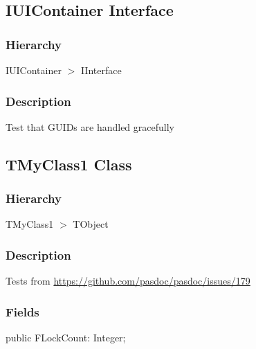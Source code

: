 \documentclass{report}
\newif\ifpdf
\begin{document}
\subsection*{IUIContainer Interface}
\fi
\label{ok_attributes.IUIContainer}
\subsubsection*{\large{\textbf{Hierarchy}}\normalsize\hspace{1ex}\hfill}
IUIContainer {$>$} IInterface
\subsubsection*{\large{\textbf{Description}}\normalsize\hspace{1ex}\hfill}
Test that GUIDs are handled gracefully\ifpdf
\subsection*{\large{\textbf{TMyClass1 Class}}\normalsize\hspace{1ex}\hrulefill}
\else
\subsection*{TMyClass1 Class}
\fi
\label{ok_attributes.TMyClass1}
\subsubsection*{\large{\textbf{Hierarchy}}\normalsize\hspace{1ex}\hfill}
TMyClass1 {$>$} TObject
\subsubsection*{\large{\textbf{Description}}\normalsize\hspace{1ex}\hfill}
Tests from \href{https://github.com/pasdoc/pasdoc/issues/179}{https://github.com/pasdoc/pasdoc/issues/179}\subsubsection*{\large{\textbf{Fields}}\normalsize\hspace{1ex}\hfill}
\begin{list}{}{
\setlength{\itemindent}{0cm}
\setlength{\listparindent}{0cm}
\setlength{\leftmargin}{\evensidemargin}
\addtolength{\leftmargin}{\tmplength}
\settowidth{\labelsep}{X}
\addtolength{\leftmargin}{\labelsep}
\setlength{\labelwidth}{\tmplength}
}
\label{ok_attributes.TMyClass1-FLockCount}
\item[\textbf{FLockCount}\hfill]
\ifpdf
\begin{flushleft}
\fi
\begin{ttfamily}
public FLockCount: Integer;\end{ttfamily}

\ifpdf
\end{flushleft}
\fi


\par  \end{list}
\ifpdf
\end{document}
